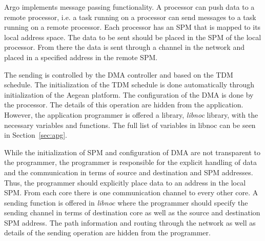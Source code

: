 \documentclass[a4paper,fontsize=10pt,twoside,DIV15,BCOR12mm,headinclude=true,footinclude=false,pagesize,bibtotoc]{scrbook}
\newcommand{\code}[1]{{\texttt{#1}}}
\begin{document}
Argo implements message passing functionality. A processor can push data 
to a remote processor, i.e. a task running on a processor
can send messages to a task running on a remote processor.
Each processor has an SPM that is mapped to its local address space.
The data to be sent should be placed in the SPM of the local processor.
From there the data is sent through a channel in the network and placed in a 
specified address in the remote SPM. 

The sending is controlled by the DMA controller and based on the TDM schedule.
The initialization of the TDM schedule is done automatically through initialization 
of the Aegean platform. The configuration of the DMA is done by the processor.
The details of this operation are hidden from the application. However,
the application programmer is offered a library, \textit{libnoc} library,
with the necessary variables and functions. The full list of variables in libnoc 
can be seen in Section~\ref{sec:apg}.

While the initialization of SPM and configuration of DMA are not transparent to the programmer,
the programmer is responsible for the explicit handling of data and the communication in terms of
source and destination and SPM addresses. 
Thus, the programmer should explicitly place data to an address in the local SPM. 
From each core there is one communication channel to every other core.
A sending function is offered in \textit{libnoc} where the programmer should specify 
the sending channel in terms of destination core as well as the source and destination SPM address. 
The path information and routing through the network as well as details of the sending operation 
are hidden from the programmer.



\end{document}
